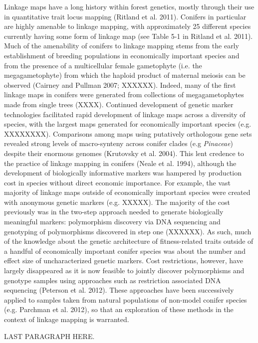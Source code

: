 \documentclass[11pt]{article}
\begin{document}
Linkage maps have a long history within forest genetics, mostly through their use in quantitative trait locus
mapping (Ritland et al. 2011). Conifers in particular are highly amenable to linkage mapping, with approximately
25 different species currently having some form of linkage map (see Table 5-1 in Ritland et al. 2011). Much of the amenability of
conifers to linkage mapping stems from the early establishment of breeding populations in economically important species and from the presence of a 
multicellular female gametophyte (i.e. the megagametophyte) from which the haploid product of maternal meiosis can be observed (Cairney and Pullman 2007;
XXXXXX). Indeed, many of the first linkage maps in conifers were generated from collections of megagametophytes made from single trees (XXXX).
Continued development of genetic marker technologies facilitated rapid development of linkage maps across a diversity of species, with 
the largest maps generated for economically important species (e.g. XXXXXXXX). Comparisons among maps using putatively orthologous gene
sets revealed strong levels of macro-synteny across conifer clades (e.g \textit{Pinaceae}) despite their enormous genomes (Krutovsky et al. 2004). This lent credence to 
the practice of linkage mapping in conifers (Neale et al. 1994), although the development of biologically informative markers was hampered by production cost in species without direct 
economic importance. For example, the vast majority of linkage maps outside of economically important species were
created with anonymous genetic markers (e.g. XXXXX). The majority of the cost previously was in the two-step approach needed to generate
biologically meaningful markers: polymorphism discovery via DNA sequencing and genotyping of polymorphisms discovered in step one (XXXXXX). 
As such, much of the knowledge about the genetic architecture of fitness-related traits outside of a
handful of economically important conifer species was about the number and effect size of uncharacterized genetic markers. Cost restrictions, however, have largely
disappeared as it is now feasible to jointly discover polymorphisms and genotype samples using approaches such as restriction associated
DNA sequencing (Peterson et al. 2012). These approaches have been successively applied to samples taken from natural populations of 
non-model conifer species (e.g. Parchman et al. 2012), so that an exploration of these methods in the context of linkage mapping is warranted.

LAST PARAGRAPH HERE.
\end{document}
